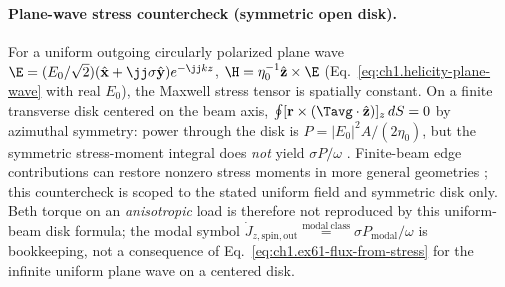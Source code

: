 \paragraph{Plane-wave stress countercheck (symmetric open disk).}
For a uniform outgoing circularly polarized plane wave $\E=(E_0/\sqrt{2})(\hat{\mathbf{x}}+\jj\sigma\hat{\mathbf{y}})e^{-\jj kz}$, $\H=\eta_0^{-1}\hat{\mathbf{z}}\times\E$ (Eq.~\eqref{eq:ch1.helicity-plane-wave} with real $E_0$), the Maxwell stress tensor is spatially constant. On a finite transverse disk centered on the beam axis, $\oint[\mathbf{r}\times(\Tavg\cdot\hat{\mathbf{z}})]_z\,dS=0$ by azimuthal symmetry: power through the disk is $P=|E_0|^2 A/(2\eta_0)$, but the symmetric stress-moment integral does \emph{not} yield $\sigma P/\omega$ \cite{stratton1941,beth1936,stewart2005}. Finite-beam edge contributions can restore nonzero stress moments in more general geometries \cite{stewart2005}; this countercheck is scoped to the stated uniform field and symmetric disk only. Beth \cite{beth1936} torque on an \emph{anisotropic} load is therefore not reproduced by this uniform-beam disk formula; the modal symbol $\dot J_{z,\mathrm{spin,out}}\stackrel{\mathrm{modal\ class}}{=}\sigma P_{\mathrm{modal}}/\omega$ is bookkeeping, not a consequence of Eq.~\eqref{eq:ch1.ex61-flux-from-stress} for the infinite uniform plane wave on a centered disk.

\FloatBarrier

